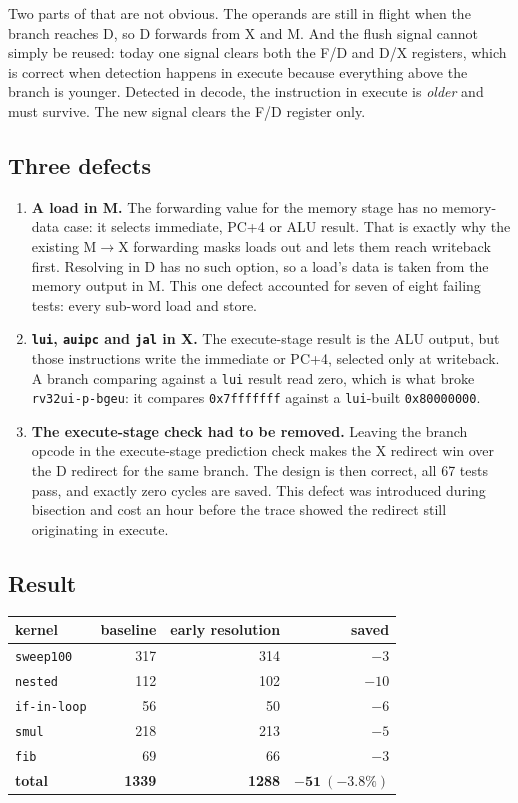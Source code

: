 \documentclass[11pt]{article}
\begin{document}
Two parts of that are not obvious. The operands are still in flight when the branch reaches D, so
D forwards from X and M. And the flush signal cannot simply be reused: today one signal clears
both the F/D and D/X registers, which is correct when detection happens in execute because
everything above the branch is younger. Detected in decode, the instruction in execute is
\emph{older} and must survive. The new signal clears the F/D register only.

\subsection{Three defects}

\begin{enumerate}
\item \textbf{A load in M.} The forwarding value for the memory stage has no memory-data case:
  it selects immediate, PC+4 or ALU result. That is exactly why the existing M$\rightarrow$X
  forwarding masks loads out and lets them reach writeback first. Resolving in D has no such
  option, so a load's data is taken from the memory output in M. This one defect accounted for
  seven of eight failing tests: every sub-word load and store.
\item \textbf{\texttt{lui}, \texttt{auipc} and \texttt{jal} in X.} The execute-stage result is
  the ALU output, but those instructions write the immediate or PC+4, selected only at
  writeback. A branch comparing against a \texttt{lui} result read zero, which is what broke
  \texttt{rv32ui-p-bgeu}: it compares \texttt{0x7fffffff} against a \texttt{lui}-built
  \texttt{0x80000000}.
\item \textbf{The execute-stage check had to be removed.} Leaving the branch opcode in the
  execute-stage prediction check makes the X redirect win over the D redirect for the same
  branch. The design is then correct, all 67 tests pass, and exactly zero cycles are saved.
  This defect was introduced during bisection and cost an hour before the trace showed the
  redirect still originating in execute.
\end{enumerate}

\subsection{Result}

\begin{center}
\begin{tabular}{lrrr}
\toprule
kernel & baseline & early resolution & saved \\
\midrule
\texttt{sweep100} & 317 & 314 & $-3$ \\
\texttt{nested}   & 112 & 102 & $-10$ \\
\texttt{if-in-loop}&  56 &  50 & $-6$ \\
\texttt{smul}     & 218 & 213 & $-5$ \\
\texttt{fib}      &  69 &  66 & $-3$ \\
\textbf{total}    & \textbf{1339} & \textbf{1288} & $\mathbf{-51\ (-3.8\%)}$ \\
\bottomrule
\end{tabular}
\end{center}
\end{document}
